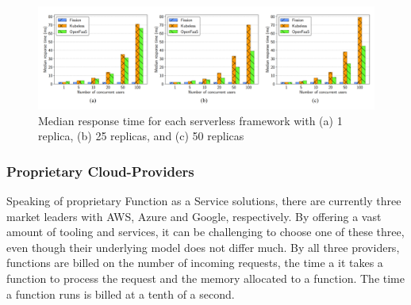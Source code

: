 \documentclass[a4paper,11pt, pagesize]{scrartcl}
\begin{document}
\begin{spacing}{1.2}
\begin{figure}[H]
\label{fig:opensource}
\centering
\includegraphics[width=1\textwidth]{opensource}
\caption{Median response time for each serverless framework with (a) 1 replica, (b) 25 replicas, and (c) 50 replicas \cite{mohanty2018evaluation}}
\end{figure}
\subsubsection{Proprietary Cloud-Providers}
Speaking of proprietary Function as a Service solutions, there are currently three market leaders \cite{kumar2019serverless} with AWS, Azure and Google, respectively. By offering a vast amount of tooling and services, it can be challenging to choose one of these three, even though their underlying model does not differ much. By all three providers, functions are billed on the number of incoming requests, the time a it takes a function to process the request and the memory allocated to a function. The time a function runs is billed at a tenth of a second. 

\end{spacing}
\end{document}
